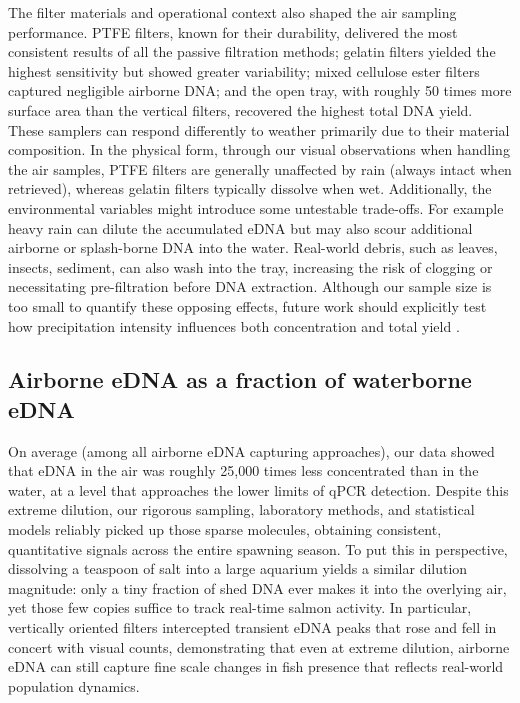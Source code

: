\documentclass{article}
\begin{document}
The filter materials and operational context also shaped the air sampling performance. PTFE filters, known for their durability, delivered the most consistent results of all the passive filtration methods; gelatin filters yielded the highest sensitivity but showed greater variability; mixed cellulose ester filters captured negligible airborne DNA; and the open tray, with roughly 50 times more surface area than the vertical filters, recovered the highest total DNA yield. These samplers can respond differently to weather primarily due to their material composition. In the physical form, through our visual observations when handling the air samples, PTFE filters are generally unaffected by rain (always intact when retrieved), whereas gelatin filters typically dissolve when wet. Additionally, the environmental variables might introduce some untestable trade-offs. For example heavy rain can dilute the accumulated eDNA but may also scour additional airborne or splash-borne DNA into the water. Real-world debris, such as leaves, insects, sediment, can also wash into the tray, increasing the risk of clogging or necessitating pre-filtration before DNA extraction. Although our sample size is too small to quantify these opposing effects, future work should explicitly test how precipitation intensity influences both concentration and total yield \cite{johnson2023}. 

\subsection{Airborne eDNA as a fraction of waterborne eDNA}
On average (among all airborne eDNA capturing approaches), our data showed that eDNA in the air was roughly 25,000 times less concentrated than in the water, at a level that approaches the lower limits of qPCR detection. Despite this extreme dilution, our rigorous sampling, laboratory methods, and statistical models reliably picked up those sparse molecules, obtaining consistent, quantitative signals across the entire spawning season. To put this in perspective, dissolving a teaspoon of salt into a large aquarium yields a similar dilution magnitude: only a tiny fraction of shed DNA ever makes it into the overlying air, yet those few copies suffice to track real-time salmon activity. In particular, vertically oriented filters intercepted transient eDNA peaks that rose and fell in concert with visual counts, demonstrating that even at extreme dilution, airborne eDNA can still capture fine scale changes in fish presence that reflects real-world population dynamics.
\end{document}
